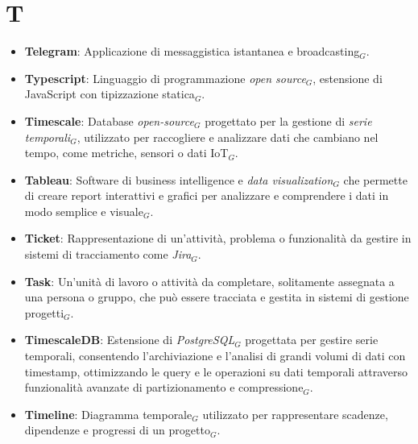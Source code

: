 \section{T}
\begin{itemize}
    \item \textbf{Telegram}: Applicazione di messaggistica istantanea e broadcasting$_G$.
    \item \textbf{Typescript}: Linguaggio di programmazione \textit{open source}$_G$, estensione di JavaScript con tipizzazione statica$_G$.
    \item \textbf{Timescale}: Database \textit{open-source}$_G$ progettato per la gestione di \textit{serie temporali}$_G$, utilizzato per raccogliere e analizzare dati che cambiano nel tempo, come metriche, sensori o dati IoT$_G$.
    \item \textbf{Tableau}: Software di business intelligence e \textit{data visualization}$_G$ che permette di creare report interattivi e grafici per analizzare e comprendere i dati in modo semplice e visuale$_G$.
    \item \textbf{Ticket}: Rappresentazione di un’attività, problema o funzionalità da gestire in sistemi di tracciamento come \textit{Jira}$_G$.
    \item \textbf{Task}: Un'unità di lavoro o attività da completare, solitamente assegnata a una persona o gruppo, che può essere tracciata e gestita in sistemi di gestione progetti$_G$.
    \item \textbf{TimescaleDB}: Estensione di \textit{PostgreSQL}$_G$ progettata per gestire serie temporali, consentendo l'archiviazione e l'analisi di grandi volumi di dati con timestamp, ottimizzando le query e le operazioni su dati temporali attraverso funzionalità avanzate di partizionamento e compressione$_G$.
    \item \textbf{Timeline}: Diagramma temporale$_G$ utilizzato per rappresentare scadenze, dipendenze e progressi di un progetto$_G$.
\end{itemize}
